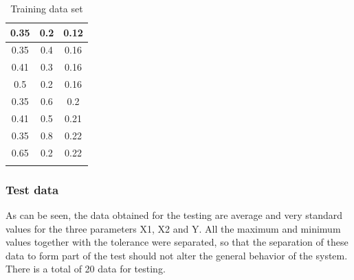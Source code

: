 \documentclass{article}
\begin{document}
\begin{doublespacing}
\begin{longtable}[c]{|c|c|c|}
0.35 & 0.2  & 0.12  \\ \hline
0.35 & 0.4  & 0.16  \\ \hline
0.41 & 0.3  & 0.16  \\ \hline
0.5  & 0.2  & 0.16  \\ \hline
0.35 & 0.6  & 0.2   \\ \hline
0.41 & 0.5  & 0.21  \\ \hline
0.35 & 0.8  & 0.22  \\ \hline
0.65 & 0.2  & 0.22  \\ \hline
\caption{Training data set}
\label{table:TrainingData}
\end{longtable}



\subsubsection{Test data}

\par As can be seen, the data obtained for the testing are average and very standard values for the three parameters X1, X2 and Y.  All the maximum and minimum values together with the tolerance were separated, so that the separation of these data to form part of the test should not alter the general behavior of the system. There is a total of 20 data for testing.


\end{doublespacing}
\end{document}
